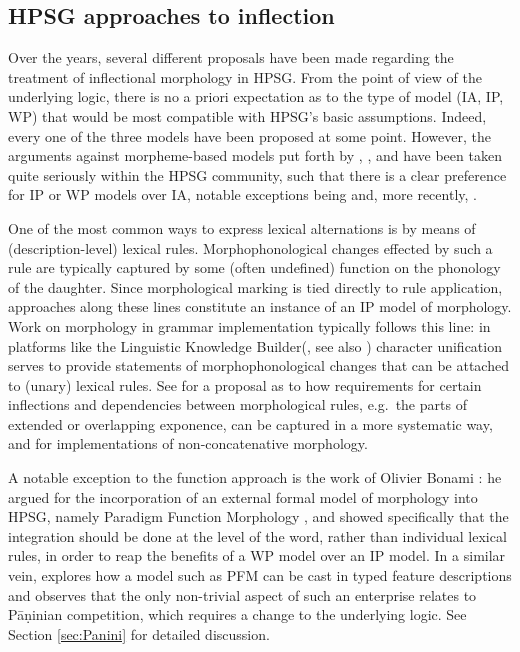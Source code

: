 \documentclass[output=paper
 	        ,biblatex
                ,babelshorthands
                ,newtxmath
                ,draftmode
                ,colorlinks, citecolor=brown
]{langscibook}
\begin{document}
\subsection{HPSG approaches to inflection}
\label{sec:InflHPSG}

Over the years, several different proposals have been made regarding the
treatment of inflectional morphology in HPSG. From the point of view
of the underlying logic, there is no a priori expectation as to the type of model
(IA, IP, WP) that would be most compatible with HPSG's basic
assumptions. Indeed, every one of the three models have been proposed at
some point. However, the arguments against morpheme-based models put
forth by \citet{Matthews72}, \citet{Spencer91}, \citet{Anderson92} and
\citet{Stump01} have been taken quite seriously within the HPSG
community, such that there is a clear preference for IP or WP models over
IA, notable exceptions being \citet{van-eynde_f94} and, more
recently, \citet{Emerson15}.

One of the most common ways to express lexical alternations is by
means of (description-level) lexical rules. Morphophonological changes
effected by such a rule are typically captured by some (often
undefined) function on the phonology of the daughter. Since
morphological marking is tied directly to rule application, approaches
along these lines constitute an instance of an IP model of
morphology. Work on morphology in grammar implementation typically
follows this line: in platforms like the Linguistic Knowledge
Builder\indexlkb  (\citealp[LKB;][]{Copestake02}, see also \crossrefchapteralp[\page \pageref{cl:delphin}]{cl})
character unification serves to provide statements of
morphophonological changes that can be attached to (unary) lexical
rules. See \citet{Goodman10} for a proposal as to how requirements for
certain inflections and dependencies
between morphological rules, e.g.\ the parts of extended or overlapping
exponence, can be captured in a more systematic way,
and \citet{Crysmann:15:JLM,Crysmann:2017:JOMO} for implementations of
non-concatenative morphology. 


A notable exception to the function approach is the work of Olivier
Bonami \citep{bonami2015diversity,Bonami14d}: he argued for the incorporation of an
external formal model of morphology into HPSG, namely Paradigm Function
Morphology  \citep[=PFM;][]{Stump01}, and
showed specifically that the integration should be done at the level
of the word, rather than individual lexical rules, in order to reap
the benefits of a WP model over an IP model. In a similar vein,
\citet{Erjavec94} explores how a model such as PFM can be cast in
typed feature descriptions and observes that the only non-trivial
aspect of such an enterprise relates to Pāṇinian competition, which
requires a change to the underlying logic. See Section
\ref{sec:Panini} for detailed discussion.
\end{document}
